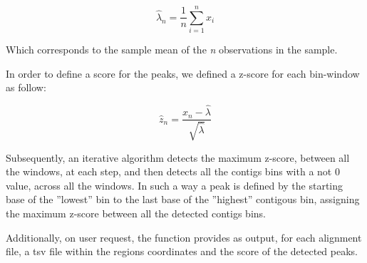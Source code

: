 \[\hat{\lambda}_n=\frac{1}{n}\sum_{i=1}^{n}x_i\]

Which corresponds to the sample mean of the \textit{n} observations in the sample.

In order to define a score for the peaks, we defined a z-score for each bin-window as follow:

\[ \hat{z}_n=\frac{x_n - \hat{\lambda} }{\sqrt{\hat{\lambda}}} \]

Subsequently, an iterative algorithm detects the maximum z-score, between all the windows, at each step, and then detects all the contigs bins with a not 0 value, across all the windows.
In such a way a peak is defined by the starting base of the ''lowest'' bin to the last base of the ''highest'' contigous bin, assigning the maximum z-score between all the detected contigs bins.

Additionally, on user request, the function provides as output, for each alignment file, a \gls{tsv} file within the regions coordinates and the score of the detected peaks.


